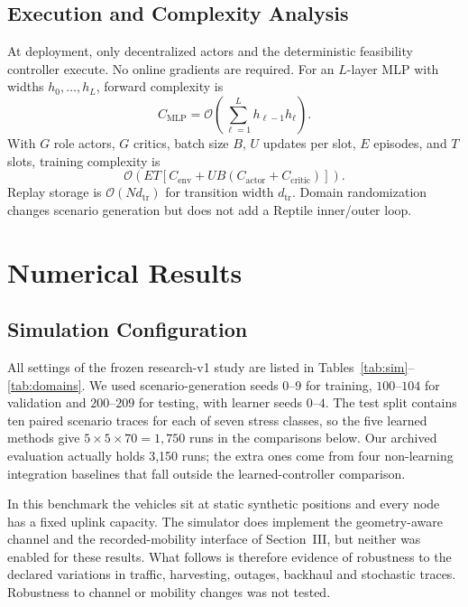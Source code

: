 \documentclass[journal]{IEEEtran}
\begin{document}
\subsection{Execution and Complexity Analysis}
At deployment, only decentralized actors and the deterministic feasibility
controller execute. No online gradients are required. For an $L$-layer MLP
with widths $h_0,\ldots,h_L$, forward complexity is
\begin{equation}
C_{\mathrm{MLP}}=\mathcal O\left(\sum_{\ell=1}^{L}h_{\ell-1}h_\ell\right).
\end{equation}
With $G$ role actors, $G$ critics, batch size $B$, $U$ updates per slot,
$E$ episodes, and $T$ slots, training complexity is
\begin{equation}
\mathcal O\left(ET\left[C_{\mathrm{env}}+UB
\left(C_{\mathrm{actor}}+C_{\mathrm{critic}}\right)\right]\right).
\end{equation}
Replay storage is $\mathcal O(Nd_{\mathrm{tr}})$ for transition width
$d_{\mathrm{tr}}$. Domain randomization changes scenario generation but does
not add a Reptile inner/outer loop.
\fi

\section{Numerical Results}
\subsection{Simulation Configuration}
All settings of the frozen research-v1 study are listed in
Tables~\ref{tab:sim}--\ref{tab:domains}. We used scenario-generation seeds
$0$--$9$ for training, $100$--$104$ for validation and $200$--$209$ for
testing, with learner seeds $0$--$4$. The test split contains ten paired
scenario traces for each of seven stress classes, so the five learned methods
give $5\times5\times70=1{,}750$ runs in the comparisons below. Our archived
evaluation actually holds 3,150 runs; the extra ones come from four
non-learning integration baselines that fall outside the learned-controller
comparison.

In this benchmark the vehicles sit at static synthetic positions and every
node has a fixed uplink capacity. The simulator does implement the
geometry-aware channel and the recorded-mobility interface of Section~III,
but neither was enabled for these results. What follows is therefore
evidence of robustness to the declared variations in traffic, harvesting,
outages, backhaul and stochastic traces. Robustness to channel or mobility
changes was not tested.
\end{document}
